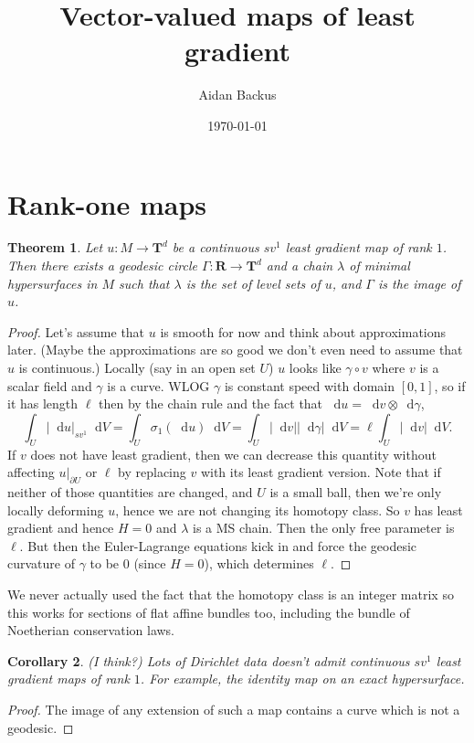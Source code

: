 \documentclass[reqno,11pt]{amsart}
\title{Vector-valued maps of least gradient}
\author{Aidan Backus}
\date{\today}
\newcommand{\RR}{\mathbf{R}}
\newcommand{\Torus}{\mathbf T}
\newcommand*\dif{\mathop{}\!\mathrm{d}}
\newtheorem{theorem}{Theorem}[section]
\newtheorem{corollary}[theorem]{Corollary}
\theoremstyle{definition}
\numberwithin{equation}{section}
\begin{document}
\begin{abstract}

\end{abstract}

\maketitle

\section{Rank-one maps}
\begin{theorem}
Let $u: M \to \Torus^d$ be a continuous $sv^1$ least gradient map of rank $1$.
Then there exists a geodesic circle $\Gamma: \RR \to \Torus^d$ and a chain $\lambda$ of minimal hypersurfaces in $M$ such that $\lambda$ is the set of level sets of $u$, and $\Gamma$ is the image of $u$. 
\end{theorem}
\begin{proof}
Let's assume that $u$ is smooth for now and think about approximations later. (Maybe the approximations are so good we don't even need to assume that $u$ is continuous.)
Locally (say in an open set $U$) $u$ looks like $\gamma \circ v$ where $v$ is a scalar field and $\gamma$ is a curve.
WLOG $\gamma$ is constant speed with domain $[0, 1]$, so if it has length $\ell$ then by the chain rule and the fact that $\dif u = \dif v \otimes \dif \gamma$,
$$\int_U |\dif u|_{sv^1} \dif V = \int_U \sigma_1(\dif u) \dif V = \int_U |\dif v| |\dif \gamma| \dif V = \ell \int_U |\dif v| \dif V.$$
If $v$ does not have least gradient, then we can decrease this quantity without affecting $u|_{\partial U}$ or $\ell$ by replacing $v$ with its least gradient version.
Note that if neither of those quantities are changed, and $U$ is a small ball, then we're only locally deforming $u$, hence we are not changing its homotopy class.
So $v$ has least gradient and hence $H = 0$ and $\lambda$ is a MS chain.
Then the only free parameter is $\ell$.
But then the Euler-Lagrange equations kick in and force the geodesic curvature of $\gamma$ to be $0$ (since $H = 0$), which determines $\ell$.
\end{proof}

We never actually used the fact that the homotopy class is an integer matrix so this works for sections of flat affine bundles too, including the bundle of Noetherian conservation laws.

\begin{corollary}
(I think?) Lots of Dirichlet data doesn't admit continuous $sv^1$ least gradient maps of rank $1$.
For example, the identity map on an exact hypersurface.
\end{corollary}
\begin{proof}
The image of any extension of such a map contains a curve which is not a geodesic.
\end{proof}
\end{document}
